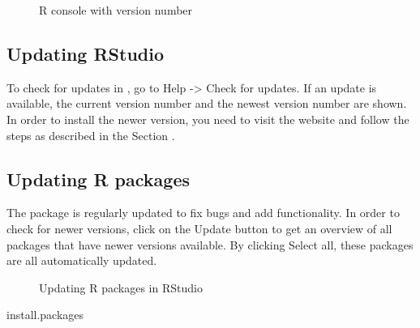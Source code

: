 \documentclass[letterpaper,10pt,english]{sphinxmanual}
\begin{document}
\begin{figure}[htbp]
\centering
\capstart

\noindent{}
\caption{R console with version number}\label{\detokenize{installation:fig27}}\label{\detokenize{installation:id16}}\end{figure}


\subsection{Updating RStudio}
\label{\detokenize{installation:updating-rstudio}}
To check for updates in , go to Help -\textgreater{} Check for updates. If an update is available,
the current version number and the newest version number are shown. In order to install
the newer version, you need to visit the
 website and follow the steps
as described in the Section {\hyperref[\detokenize{installation:installing-r-and-rstudio}]{}}.


\subsection{Updating R packages}
\label{\detokenize{installation:updating-r-packages}}
The  package is regularly updated to fix bugs and add functionality. In order to check
for newer versions, click on the Update button to get an overview of all packages that have
newer versions available. By clicking Select all, these packages are all automatically updated.

\begin{figure}[htbp]
\centering
\capstart

\noindent{}
\caption{Updating R packages in RStudio}\label{\detokenize{installation:id6}}\label{\detokenize{installation:id17}}\end{figure}

\def\sphinxLiteralBlockLabel{\label{\detokenize{installation:code03}}}
%
\begin{sphinxVerbatim}[commandchars=\\\{\},numbers=left,firstnumber=1,stepnumber=1]
install.packages
\end{sphinxVerbatim}
\end{document}
